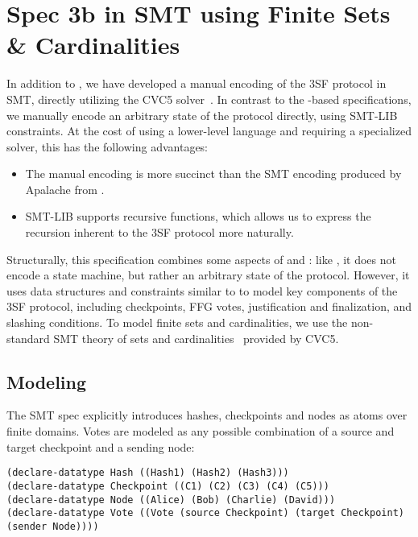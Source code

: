 
\section{Spec 3b in SMT using Finite Sets \& Cardinalities}

In addition to \SpecThree{}, we have developed a manual encoding of the 3SF
protocol in SMT, directly utilizing the CVC5 solver~\cite{DBLP:conf/tacas/BarbosaBBKLMMMN22}.
In contrast to the \tlap{}-based specifications, we manually encode an
arbitrary state of the protocol
directly, using SMT-LIB constraints. At the cost of using a lower-level language and
requiring a specialized solver, this has the following advantages:
\begin{itemize}
  \item The manual encoding is more succinct than the SMT encoding produced by
    Apalache from \tlap{}.
  \item SMT-LIB supports recursive functions, which allows us to express the
    recursion inherent to the 3SF protocol more naturally.
\end{itemize}

Structurally, this specification combines some aspects of \SpecTwo{} and
\SpecThree{}: like \SpecTwo{}, it does not encode a state machine, but rather
an arbitrary state of the protocol. However, it uses data structures and
constraints similar to \SpecThree{} to model key components of the 3SF
protocol, including checkpoints, FFG votes, justification and finalization,
and slashing conditions.
To model finite sets and cardinalities, we use the non-standard SMT theory of
sets and cardinalities~\cite{DBLP:journals/lmcs/BansalBRT18} provided by CVC5.

\subsection{Modeling}
The SMT spec explicitly introduces hashes, checkpoints and nodes as atoms over
finite domains. Votes are modeled as any possible combination
of a source and target checkpoint and a sending node:

\begin{lstlisting}[language=smt]
(declare-datatype Hash ((Hash1) (Hash2) (Hash3)))
(declare-datatype Checkpoint ((C1) (C2) (C3) (C4) (C5)))
(declare-datatype Node ((Alice) (Bob) (Charlie) (David)))
(declare-datatype Vote ((Vote (source Checkpoint) (target Checkpoint) (sender Node))))
\end{lstlisting}

